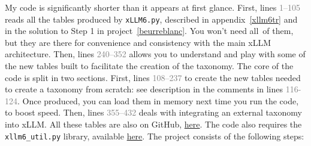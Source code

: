 \documentclass[oneside,10pt]{book}
\begin{document}
My code is significantly shorter than it appears at first glance. First, lines \textcolor{gray}{1--105} reads all the tables produced by 
 \texttt{xLLM6.py}, described in appendix~\ref{xllm6tr} and in the solution to Step 1 in project~\ref{beurreblanc}. You won't need all~of them, but they are there for convenience and
 consistency with the main xLLM architecture.  Then, lines \textcolor{gray}{240--352} allows you to understand and play with some of the new tables built to facilitate 
 the creation of the taxonomy.  The core of the code is split in two sections. First, lines  \textcolor{gray}{108--237} to create the new tables needed to create a taxonomy from scratch: see description in the 
 comments in lines  \textcolor{gray}{116-124}. Once produced, you can load them in memory next time you run the code, to boost speed. 
Then, lines \textcolor{gray}{355--432} deals with integrating an external taxonomy into xLLM. All these tables are also on GitHub, 
\href{https://github.com/VincentGranville/Large-Language-Models/tree/main/xllm6/build-taxonomy}{here}. 
The code also requires the \texttt{xllm6\_util.py} library, available \href{https://github.com/VincentGranville/Large-Language-Models/blob/main/xllm6/xllm6_util.py}{here}. 
\vspace{1ex}
The project consists of the following steps:
\end{document}
